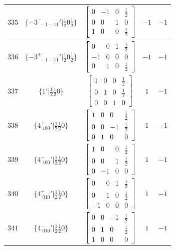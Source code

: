 \documentclass[fleqn,8pt]{jsarticle}
\begin{document}
\begin{longtable}{ccccc}
$ 335 $ & $ \{-3^{-}_{\,\,-1-11}{}'|\frac{1}{2} 0 \frac{1}{2}\} $ & $ \begin{bmatrix} 0 & -1 & 0 & \frac{1}{2} \\ 0 & 0 & 1 & 0 \\ 1 & 0 & 0 & \frac{1}{2} \end{bmatrix} $ & $ -1 $ & $ -1 $ \\ \hline
$ 336 $ & $ \{-3^{+}_{\,\,-1-11}{}'|\frac{1}{2} 0 \frac{1}{2}\} $ & $ \begin{bmatrix} 0 & 0 & 1 & \frac{1}{2} \\ -1 & 0 & 0 & 0 \\ 0 & 1 & 0 & \frac{1}{2} \end{bmatrix} $ & $ -1 $ & $ -1 $ \\ \hline
$ 337 $ & $ \{1{}'|\frac{1}{2} \frac{1}{2} 0\} $ & $ \begin{bmatrix} 1 & 0 & 0 & \frac{1}{2} \\ 0 & 1 & 0 & \frac{1}{2} \\ 0 & 0 & 1 & 0 \end{bmatrix} $ & $ 1 $ & $ -1 $ \\ \hline
$ 338 $ & $ \{4^{+}_{\,\,100}{}'|\frac{1}{2} \frac{1}{2} 0\} $ & $ \begin{bmatrix} 1 & 0 & 0 & \frac{1}{2} \\ 0 & 0 & -1 & \frac{1}{2} \\ 0 & 1 & 0 & 0 \end{bmatrix} $ & $ 1 $ & $ -1 $ \\ \hline
$ 339 $ & $ \{4^{-}_{\,\,100}{}'|\frac{1}{2} \frac{1}{2} 0\} $ & $ \begin{bmatrix} 1 & 0 & 0 & \frac{1}{2} \\ 0 & 0 & 1 & \frac{1}{2} \\ 0 & -1 & 0 & 0 \end{bmatrix} $ & $ 1 $ & $ -1 $ \\ \hline
$ 340 $ & $ \{4^{+}_{\,\,010}{}'|\frac{1}{2} \frac{1}{2} 0\} $ & $ \begin{bmatrix} 0 & 0 & 1 & \frac{1}{2} \\ 0 & 1 & 0 & \frac{1}{2} \\ -1 & 0 & 0 & 0 \end{bmatrix} $ & $ 1 $ & $ -1 $ \\ \hline
$ 341 $ & $ \{4^{-}_{\,\,010}{}'|\frac{1}{2} \frac{1}{2} 0\} $ & $ \begin{bmatrix} 0 & 0 & -1 & \frac{1}{2} \\ 0 & 1 & 0 & \frac{1}{2} \\ 1 & 0 & 0 & 0 \end{bmatrix} $ & $ 1 $ & $ -1 $ \\ \hline

\end{longtable}
\end{document}
